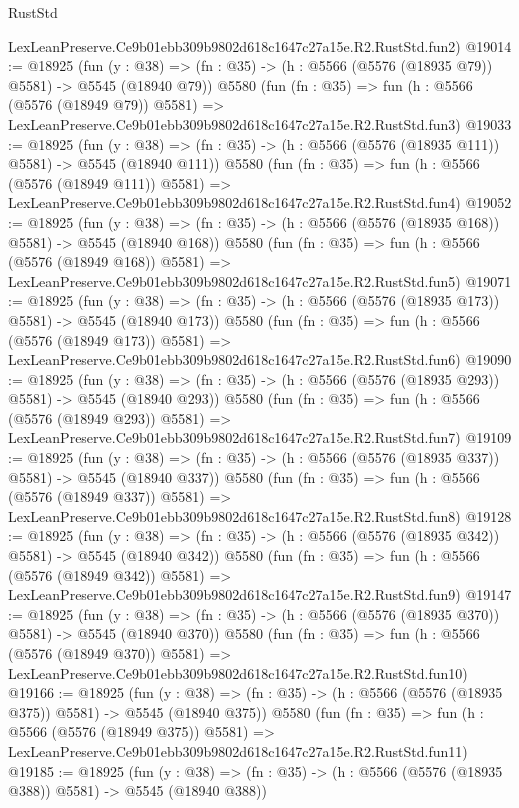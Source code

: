\begin{lexlean}{RustStd}
\begin{coremodule}
    LexLeanPreserve.Ce9b01ebb309b9802d618c1647c27a15e.R2.RustStd.fun2)
@19014 := @18925
    (fun (y : @38) => (fn : @35) -> (h : @5566 (@5576 (@18935 @79)) @5581) -> @5545 (@18940 @79))
    @5580
    (fun (fn : @35) =>
    fun (h : @5566 (@5576 (@18949 @79)) @5581) =>
    LexLeanPreserve.Ce9b01ebb309b9802d618c1647c27a15e.R2.RustStd.fun3)
@19033 := @18925
    (fun (y : @38) => (fn : @35) -> (h : @5566 (@5576 (@18935 @111)) @5581) -> @5545 (@18940 @111))
    @5580
    (fun (fn : @35) =>
    fun (h : @5566 (@5576 (@18949 @111)) @5581) =>
    LexLeanPreserve.Ce9b01ebb309b9802d618c1647c27a15e.R2.RustStd.fun4)
@19052 := @18925
    (fun (y : @38) => (fn : @35) -> (h : @5566 (@5576 (@18935 @168)) @5581) -> @5545 (@18940 @168))
    @5580
    (fun (fn : @35) =>
    fun (h : @5566 (@5576 (@18949 @168)) @5581) =>
    LexLeanPreserve.Ce9b01ebb309b9802d618c1647c27a15e.R2.RustStd.fun5)
@19071 := @18925
    (fun (y : @38) => (fn : @35) -> (h : @5566 (@5576 (@18935 @173)) @5581) -> @5545 (@18940 @173))
    @5580
    (fun (fn : @35) =>
    fun (h : @5566 (@5576 (@18949 @173)) @5581) =>
    LexLeanPreserve.Ce9b01ebb309b9802d618c1647c27a15e.R2.RustStd.fun6)
@19090 := @18925
    (fun (y : @38) => (fn : @35) -> (h : @5566 (@5576 (@18935 @293)) @5581) -> @5545 (@18940 @293))
    @5580
    (fun (fn : @35) =>
    fun (h : @5566 (@5576 (@18949 @293)) @5581) =>
    LexLeanPreserve.Ce9b01ebb309b9802d618c1647c27a15e.R2.RustStd.fun7)
@19109 := @18925
    (fun (y : @38) => (fn : @35) -> (h : @5566 (@5576 (@18935 @337)) @5581) -> @5545 (@18940 @337))
    @5580
    (fun (fn : @35) =>
    fun (h : @5566 (@5576 (@18949 @337)) @5581) =>
    LexLeanPreserve.Ce9b01ebb309b9802d618c1647c27a15e.R2.RustStd.fun8)
@19128 := @18925
    (fun (y : @38) => (fn : @35) -> (h : @5566 (@5576 (@18935 @342)) @5581) -> @5545 (@18940 @342))
    @5580
    (fun (fn : @35) =>
    fun (h : @5566 (@5576 (@18949 @342)) @5581) =>
    LexLeanPreserve.Ce9b01ebb309b9802d618c1647c27a15e.R2.RustStd.fun9)
@19147 := @18925
    (fun (y : @38) => (fn : @35) -> (h : @5566 (@5576 (@18935 @370)) @5581) -> @5545 (@18940 @370))
    @5580
    (fun (fn : @35) =>
    fun (h : @5566 (@5576 (@18949 @370)) @5581) =>
    LexLeanPreserve.Ce9b01ebb309b9802d618c1647c27a15e.R2.RustStd.fun10)
@19166 := @18925
    (fun (y : @38) => (fn : @35) -> (h : @5566 (@5576 (@18935 @375)) @5581) -> @5545 (@18940 @375))
    @5580
    (fun (fn : @35) =>
    fun (h : @5566 (@5576 (@18949 @375)) @5581) =>
    LexLeanPreserve.Ce9b01ebb309b9802d618c1647c27a15e.R2.RustStd.fun11)
@19185 := @18925
    (fun (y : @38) => (fn : @35) -> (h : @5566 (@5576 (@18935 @388)) @5581) -> @5545 (@18940 @388))

\end{coremodule}
\end{lexlean}
